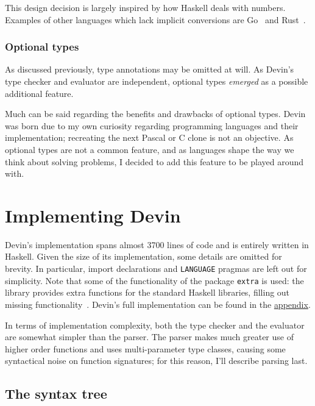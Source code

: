 \documentclass[UdineBachThesis,american,11pt]{PhdThesis}
\begin{document}
  This design decision is largely inspired by how Haskell deals with numbers.
  Examples of other languages which lack implicit conversions are
  Go~\cite{go-numeric-types} and Rust~\cite{rust-conversion}.

  \subsection{Optional types}

  As discussed previously, type annotations may be omitted at will. As Devin's
  type checker and evaluator are independent, optional types \emph{emerged} as a
  possible additional feature.

  Much can be said regarding the benefits and drawbacks of optional types. Devin
  was born due to my own curiosity regarding programming languages and their
  implementation; recreating the next Pascal or C clone is not an objective. As
  optional types are not a common feature, and as languages shape the way we
  think about solving problems, I decided to add this feature to be played
  around with.

  \newpage
  \thispagestyle{empty}

  \chapter{Implementing Devin}

  Devin's implementation spans almost 3700 lines of code and is entirely written
  in Haskell. Given the size of its implementation, some details are omitted for
  brevity. In particular, import declarations and \mbox{\texttt{LANGUAGE}}
  pragmas are left out for simplicity. Note that some of the functionality of
  the package \mbox{\texttt{extra}} is used: the library provides extra
  functions for the standard Haskell libraries, filling out missing
  functionality~\cite{extra}. Devin's full implementation can be found in the
  \hyperref[chapter:devin-source-code]{appendix}.

  In terms of implementation complexity, both the type checker and the evaluator
  are somewhat simpler than the parser. The parser makes much greater use of
  higher order functions and uses multi-parameter type classes, causing some
  syntactical noise on function signatures; for this reason, I'll describe
  parsing last.

  \section{The syntax tree}
\end{document}
